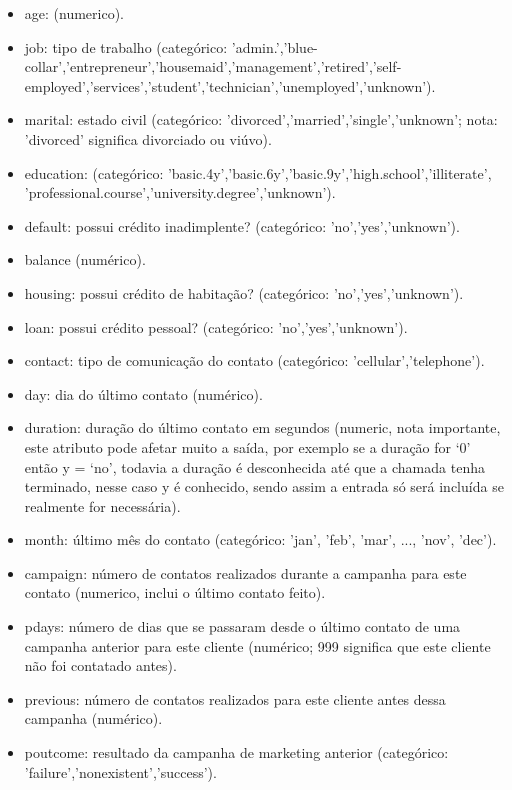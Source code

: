 \documentclass[conference]{IEEEtran}
\begin{document}
\begin{itemize}
    \item age: (numerico).

    \item job: tipo de trabalho (categórico: 'admin.','blue-collar','entrepreneur','housemaid','management','retired','self-employed','services','student','technician','unemployed','unknown').

    \item marital: estado civil (categórico: 'divorced','married','single','unknown'; nota: 'divorced' significa divorciado ou viúvo).

    \item education: (categórico: 'basic.4y','basic.6y','basic.9y','high.school','illiterate', 'professional.course','university.degree','unknown').

    \item default: possui crédito inadimplente? (categórico: 'no','yes','unknown').

    \item balance (numérico).

    \item housing: possui crédito de habitação? (categórico: 'no','yes','unknown').

    \item loan: possui crédito pessoal? (categórico: 'no','yes','unknown').

    \item contact: tipo de comunicação do contato (categórico: 'cellular','telephone').

    \item day: dia do último contato  (numérico).

    \item duration: duração do último contato em segundos (numeric, nota importante, este atributo pode afetar muito a saída, por exemplo se a duração for ‘0’ então y = ‘no’, todavia a duração é desconhecida até que a chamada tenha terminado, nesse caso y é conhecido, sendo assim a entrada só será  incluída se realmente for necessária).

    \item month: último mês do contato (categórico: 'jan', 'feb', 'mar', ..., 'nov', 'dec').

    \item campaign: número de contatos realizados durante a campanha para este contato (numerico, inclui o último contato feito).
    
    \item pdays: número de dias que se passaram desde o último contato de uma campanha anterior para este cliente (numérico; 999 significa que este cliente não foi contatado antes).

    \item previous: número de contatos realizados para este cliente antes dessa campanha (numérico).

    \item poutcome: resultado da campanha de marketing anterior (categórico: 'failure','nonexistent','success').
\end{itemize}
\end{document}
